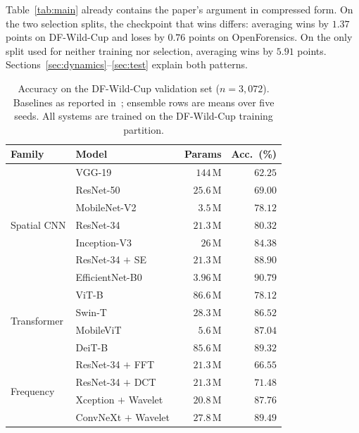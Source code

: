 \documentclass[10pt,journal]{IEEEtran}
\begin{document}
Table~\ref{tab:main} already contains the paper's argument in compressed form.
On the two selection splits, the checkpoint that wins differs: averaging wins
by $1.37$ points on DF-Wild-Cup and loses by $0.76$ points on OpenForensics.
On the only split used for neither training nor selection, averaging wins by
$5.91$ points. Sections~\ref{sec:dynamics}--\ref{sec:test} explain both
patterns.

\begin{table}[!tb]
\caption{Accuracy on the DF-Wild-Cup validation set ($n=3{,}072$). Baselines as
reported in~\cite{bhattacharjee2026caenet}; ensemble rows are means over five
seeds. All systems are trained on the DF-Wild-Cup training partition.}
\label{tab:spcup}
\centering
\footnotesize
\begin{tabular}{@{}llrr@{}}
\toprule
Family & Model & Params & Acc.\ (\%) \\
\midrule
\multirow{7}{*}{Spatial CNN}
 & VGG-19~\cite{simonyan2015vgg}          & $144$\,M  & $62.25$ \\
 & ResNet-50~\cite{he2016resnet}          & $25.6$\,M & $69.00$ \\
 & MobileNet-V2                            & $3.5$\,M  & $78.12$ \\
 & ResNet-34~\cite{he2016resnet}          & $21.3$\,M & $80.32$ \\
 & Inception-V3                            & $26$\,M   & $84.38$ \\
 & ResNet-34 $+$ SE~\cite{hu2018senet}    & $21.3$\,M & $88.90$ \\
 & EfficientNet-B0~\cite{tan2019efficientnet} & $3.96$\,M & $90.79$ \\
\midrule
\multirow{4}{*}{Transformer}
 & ViT-B~\cite{dosovitskiy2021vit}        & $86.6$\,M & $78.12$ \\
 & Swin-T~\cite{liu2021swin}              & $28.3$\,M & $86.52$ \\
 & MobileViT                               & $5.6$\,M  & $87.04$ \\
 & DeiT-B~\cite{touvron2021deit}          & $85.6$\,M & $89.32$ \\
\midrule
\multirow{4}{*}{Frequency}
 & ResNet-34 $+$ FFT                       & $21.3$\,M & $66.55$ \\
 & ResNet-34 $+$ DCT~\cite{frank2020frequency} & $21.3$\,M & $71.48$ \\
 & Xception $+$ Wavelet                    & $20.8$\,M & $87.76$ \\
 & ConvNeXt $+$ Wavelet~\cite{liu2022convnext} & $27.8$\,M & $89.49$ \\

\end{tabular}
\end{table}
\end{document}
